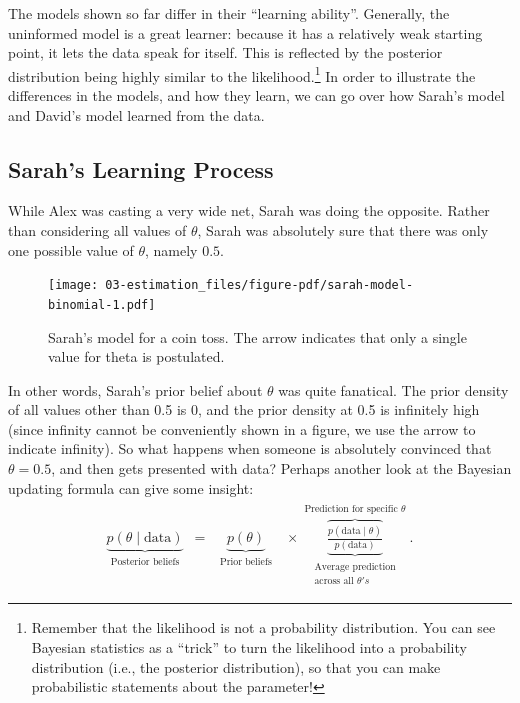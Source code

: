 \documentclass[
  letterpaper,
  DIV=11,
  numbers=noendperiod]{scrreprt}
\begin{document}
The models shown so far differ in their ``learning ability''. Generally,
the uninformed model is a great learner: because it has a relatively
weak starting point, it lets the data speak for itself. This is
reflected by the posterior distribution being highly similar to the
likelihood.\footnote{Remember that the likelihood is not a probability
  distribution. You can see Bayesian statistics as a ``trick'' to turn
  the likelihood into a probability distribution (i.e., the posterior
  distribution), so that you can make probabilistic statements about the
  parameter!} In order to illustrate the differences in the models, and
how they learn, we can go over how Sarah's model and David's model
learned from the data.

\hypertarget{sarahs-learning-process}{%
\subsection{Sarah's Learning Process}\label{sarahs-learning-process}}

While Alex was casting a very wide net, Sarah was doing the opposite.
Rather than considering all values of \(\theta\), Sarah was absolutely
sure that there was only one possible value of \(\theta\), namely
\(0.5\).

\begin{figure}

{\centering \texttt{[image: 03-estimation\_files/figure-pdf/sarah-model-binomial-1.pdf]}

}

\caption{Sarah's model for a coin toss. The arrow indicates that only a
single value for theta is postulated.}

\end{figure}

In other words, Sarah's prior belief about \(\theta\) was quite
fanatical. The prior density of all values other than 0.5 is 0, and the
prior density at 0.5 is infinitely high (since infinity cannot be
conveniently shown in a figure, we use the arrow to indicate infinity).
So what happens when someone is absolutely convinced that
\(\theta = 0.5\), and then gets presented with data? Perhaps another
look at the Bayesian updating formula can give some insight:
\begin{align}
\underbrace{ p(\theta \mid \text{data})}_{\substack{\text{Posterior beliefs}}} \,\,\, = \,\,\,
\underbrace{ p(\theta)}_{\substack{\text{Prior beliefs} }}
\,\,\,\, \times
\overbrace{\underbrace{\frac{p( \text{data} \mid \theta)}{p( \text{data})}}}^{\substack{\text{Prediction for specific }\theta }}_{\substack{\text{Average prediction} \\\text{across all }  \theta's}}.
\end{align}
\end{document}
